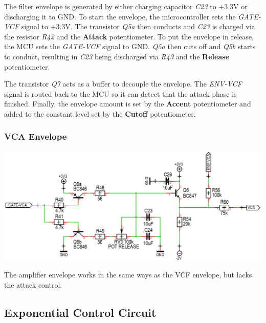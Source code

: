\documentclass{scrartcl}
\begin{document}
The filter envelope is generated by either charging capacitor \emph{C23} to +3.3V or discharging it to GND. To start the envelope, the microcontroller sets the \emph{GATE-VCF} signal to +3.3V. The transistor \emph{Q5a} then conducts and \emph{C23} is charged via the resistor \emph{R42} and the \textbf{Attack} potentiometer. To put the envelope in release, the MCU sets the \emph{GATE-VCF} signal to GND. \emph{Q5a} then cuts off and \emph{Q5b} starts to conduct, resulting in \emph{C23} being discharged via \emph{R43} and the \textbf{Release} potentiometer.

The transistor \emph{Q7} acts as a buffer to decouple the envelope. The \emph{ENV-VCF} signal is routed back to the MCU so it can detect that the attack phase is finished. Finally, the envelope amount is set by the \textbf{Accent} potentiometer and added to the constant level set by the \textbf{Cutoff} potentiometer.

\subsubsection{VCA Envelope}

\begin{center}
    \includegraphics[scale=0.35]{assets/schema-ar-vca.png}
\end{center}

The amplifier envelope works in the same ways as the VCF envelope, but lacks the attack control.

\subsection{Exponential Control Circuit}
\end{document}
